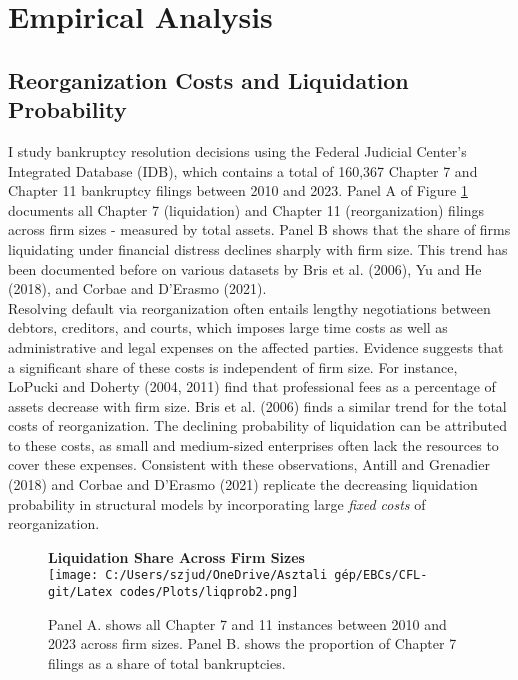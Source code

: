 \documentclass[12pt]{article}
\begin{document}
\section{Empirical Analysis \label{sec:empirical analysis}}

\subsection{Reorganization Costs and Liquidation Probability \label{sec:emp liqprob}} 

I study bankruptcy resolution decisions using the Federal Judicial Center's Integrated Database (IDB), which contains a total of 160,367 Chapter 7 and Chapter 11 bankruptcy filings between 2010 and 2023. Panel A of Figure \ref{chart:liqprob_emp} documents all Chapter 7 (liquidation) and Chapter 11 (reorganization) filings across firm sizes - measured by total assets. Panel B shows that the share of firms liquidating under financial distress declines sharply with firm size. This trend has been documented before on various datasets by Bris et al. (2006), Yu and He (2018), and Corbae and D'Erasmo (2021). \vspace{3mm} \\
Resolving default via reorganization often entails lengthy negotiations between debtors, creditors, and courts, which imposes large time costs as well as administrative and legal expenses on the affected parties. Evidence suggests that a significant share of these costs is independent of firm size. For instance, LoPucki and Doherty (2004, 2011) find that professional fees as a percentage of assets decrease with firm size. Bris et al. (2006) finds a similar trend for the total costs of reorganization. The declining probability of liquidation can be attributed to these costs, as small and medium-sized enterprises often lack the resources to cover these expenses. Consistent with these observations, Antill and Grenadier (2018) and Corbae and D'Erasmo (2021) replicate the decreasing liquidation probability in structural models by incorporating large \textit{fixed costs} of reorganization.

\begin{figure}[H]  %
    \centering  
    \textbf{\large Liquidation Share Across Firm Sizes \vspace{2mm} } \\  %
    \texttt{[image: C:/Users/szjud/OneDrive/Asztali gép/EBCs/CFL-git/Latex codes/Plots/liqprob2.png]}
    \caption{ \small Panel A. shows all Chapter 7 and 11 instances between 2010 and 2023 across firm sizes. Panel B. shows the proportion of Chapter 7 filings as a share of total bankruptcies.}
    \label{chart:liqprob_emp}
\end{figure}
\end{document}
